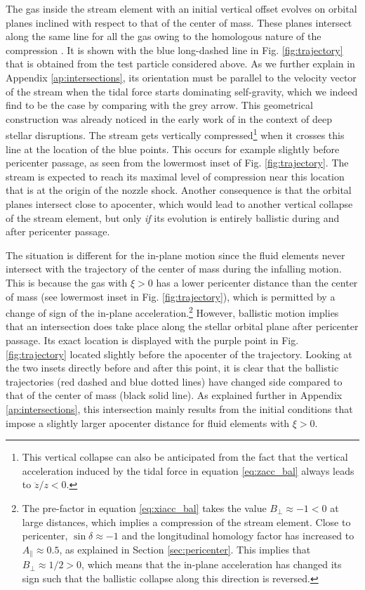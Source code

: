 \documentclass[a4paper,fleqn,usenatbib]{mnras}
\begin{document}
The gas inside the stream element with an initial vertical offset evolves on orbital planes inclined with respect to that of the center of mass. These planes intersect along the same line for all the gas owing to the homologous nature of the compression \citep{stone2013}. It is shown with the blue long-dashed line in Fig. \ref{fig:trajectory} that is obtained from the test particle considered above. As we further explain in Appendix \ref{ap:intersections}, its orientation must be parallel to the velocity vector of the stream when the tidal force starts dominating self-gravity, which we indeed find to be the case by comparing with the grey arrow. This geometrical construction was already noticed in the early work of \citet{luminet1985} in the context of deep stellar disruptions. The stream gets vertically compressed\footnote{This vertical collapse can also be anticipated from the fact that the vertical acceleration induced by the tidal force in equation \eqref{eq:zacc_bal} always leads to $\ddot{z}/z<0$.} when it crosses this line at the location of the blue points. This occurs for example slightly before pericenter passage, as seen from the lowermost inset of Fig. \ref{fig:trajectory}. The stream is expected to reach its maximal level of compression near this location that is at the origin of the nozzle shock. Another consequence is that the orbital planes intersect close to apocenter, which would lead to another vertical collapse of the stream element, but only \textit{if} its evolution is entirely ballistic during and after pericenter passage.




The situation is different for the in-plane motion since the fluid elements never intersect with the trajectory of the center of mass during the infalling motion. This is because the gas with $\xi>0$ has a lower pericenter distance than the center of mass (see lowermost inset in Fig. \ref{fig:trajectory}), which is permitted by a change of sign of the in-plane acceleration.\footnote{The pre-factor in equation \eqref{eq:xiacc_bal} takes the value $B_{\perp} \approx -1 < 0$ at large distances, which implies a compression of the stream element. Close to pericenter, $\sin \delta \approx -1$ and the longitudinal homology factor has increased to $A_{\parallel} \approx 0.5$, as explained in Section \ref{sec:pericenter}. This implies that $B_{\perp} \approx 1/2 > 0$, which means that the in-plane acceleration has changed its sign such that the ballistic collapse along this direction is reversed.} However, ballistic motion implies that an intersection does take place along the stellar orbital plane after pericenter passage. Its exact location is displayed with the purple point in Fig. \ref{fig:trajectory} located slightly before the apocenter of the trajectory. Looking at the two insets directly before and after this point, it is clear that the ballistic trajectories (red dashed and blue dotted lines) have changed side compared to that of the center of mass (black solid line). As explained further in Appendix \ref{ap:intersections}, this intersection mainly results from the initial conditions that impose a slightly larger apocenter distance for fluid elements with $\xi > 0$.
\end{document}

